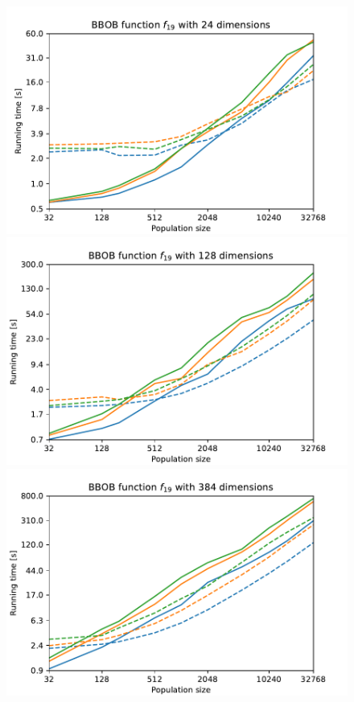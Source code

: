 \begin{figure}[ht!]
    \begin{minipage}[t]{0.32\textwidth}
        \centering
        \includegraphics[width=\textwidth]{img/runs/time_es_schema_fn19_24d.pdf}
    \end{minipage}
    \hfill
    \begin{minipage}[t]{0.32\textwidth}
        \centering
        \includegraphics[width=\textwidth]{img/runs/time_es_schema_fn19_128d.pdf}
    \end{minipage}
    \hfill
    \begin{minipage}[t]{0.32\textwidth}
        \centering
        \includegraphics[width=\textwidth]{img/runs/time_es_schema_fn19_384d.pdf}

\end{minipage}
\end{figure}
